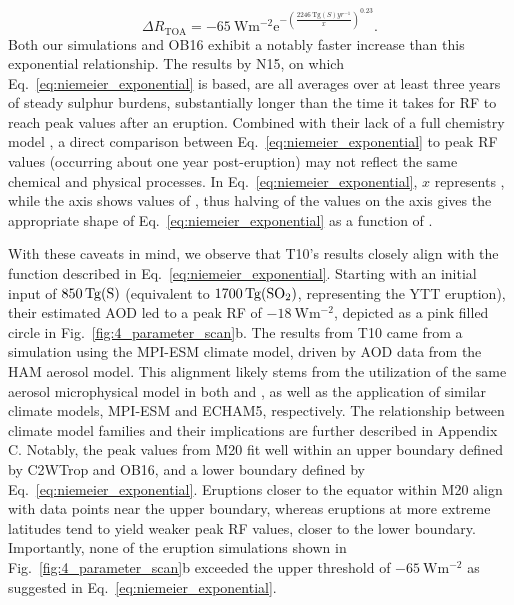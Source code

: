 \documentclass[draft]{agujournal2019}
\begin{document}
  \begin{equation}
    \Delta R_{\mathrm{TOA}} = -\SI{65}{\watt\metre^{-2}}
    \mathrm{e}^{-{\left(\frac{\SI{2246}{\tera\gram(S)yr^{-1}}}{x}\right)}^{0.23}}.
    \label{eq:niemeier_exponential}
  \end{equation}
  Both our simulations and OB16 exhibit a notably faster increase than this exponential
  relationship. The results by N15, on which Eq.~\ref{eq:niemeier_exponential} is based,
  are all averages over at least three years of steady sulphur burdens, substantially
  longer than the time it takes for RF to reach peak values after an eruption. Combined
  with their lack of a full chemistry model \cite{niemeier2015}, a direct comparison
  between Eq.~\ref{eq:niemeier_exponential} to peak RF values (occurring about one year
  post-eruption) may not reflect the same chemical and physical processes. In
  Eq.~\ref{eq:niemeier_exponential}, \(x\) represents , while the axis shows
  values of , thus halving of the  values on the axis gives the
  appropriate shape of Eq.~\ref{eq:niemeier_exponential} as a function of .

  With these caveats in mind, we observe that T10's results closely align with the
  function described in Eq.~\ref{eq:niemeier_exponential}. Starting with an initial
  input of \(\SI{850}{\tera\gram(\ce{S})}\) (equivalent to
  \(\SI{1700}{\tera\gram(\ce{SO2})}\), representing the YTT eruption), their estimated
  AOD led to a peak RF of \(\SI{-18}{\watt\meter^{-2}}\), depicted as a pink filled
  circle in Fig.~\ref{fig:4_parameter_scan}b. The results from T10 came from a
  simulation using the MPI-ESM climate model, driven by AOD data from the HAM aerosol
  model. This alignment likely stems from the utilization of the same aerosol
  microphysical model in both  and , as well as
  the application of similar climate models, MPI-ESM and ECHAM5, respectively. The
  relationship between climate model families and their implications are further
  described in Appendix C. Notably, the peak values from M20 fit well within an upper
  boundary defined by C2WTrop and OB16, and a lower boundary defined by
  Eq.~\ref{eq:niemeier_exponential}. Eruptions closer to the equator within M20 align
  with data points near the upper boundary, whereas eruptions at more extreme latitudes
  tend to yield weaker peak RF values, closer to the lower boundary. Importantly, none
  of the eruption simulations shown in Fig.~\ref{fig:4_parameter_scan}b exceeded the
  upper threshold of \(\SI{-65}{\watt\meter^{-2}}\) as suggested in
  Eq.~\ref{eq:niemeier_exponential}.
\end{document}
